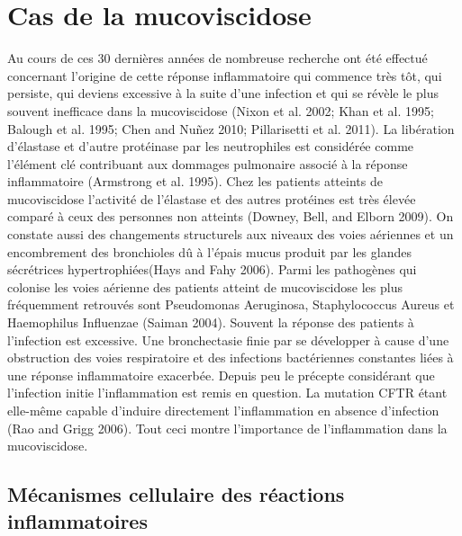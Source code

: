 		\section{Cas de la mucoviscidose}
Au cours de ces 30 dernières années de nombreuse recherche ont été effectué concernant l’origine de cette réponse inflammatoire qui commence très tôt, qui persiste, qui deviens excessive à la suite d’une infection et qui se révèle le plus souvent inefficace dans la mucoviscidose (Nixon et al. 2002; Khan et al. 1995; Balough et al. 1995; Chen and Nuñez 2010; Pillarisetti et al. 2011)\cite{nixon_early_2002}\cite{khan_early_1995}\cite{balough_relationship_1995}\cite{chen_sterile_2010}\cite{pillarisetti_infection_2011}. La libération d’élastase et d’autre protéinase par les neutrophiles est considérée comme l’élément clé contribuant aux dommages pulmonaire associé à la réponse inflammatoire (Armstrong et al. 1995)\cite{armstrong_lower_1995}. Chez les patients atteints de mucoviscidose l’activité de l’élastase et des autres protéines est très élevée comparé à ceux des personnes non atteints (Downey, Bell, and Elborn 2009)\cite{downey_neutrophils_2009}. On constate aussi des changements structurels aux niveaux des voies aériennes et un encombrement des bronchioles dû à l’épais mucus produit par les glandes sécrétrices hypertrophiées(Hays and Fahy 2006)\cite{hays_characterizing_2006}. 
Parmi les pathogènes qui colonise les voies aérienne des patients atteint de mucoviscidose les plus fréquemment retrouvés sont Pseudomonas Aeruginosa, Staphylococcus Aureus et Haemophilus Influenzae (Saiman 2004)\cite{saiman_microbiology_2004}. Souvent la réponse des patients à l’infection est excessive. Une bronchectasie finie par se développer à cause d’une obstruction des voies respiratoire et des infections bactériennes constantes liées à une réponse inflammatoire exacerbée. Depuis peu le précepte considérant que l’infection initie l’inflammation est remis en question. La mutation CFTR étant elle-même capable d’induire directement l’inflammation en absence d’infection (Rao and Grigg 2006)\cite{rao_new_2006}. Tout ceci montre l’importance de l’inflammation dans la mucoviscidose. 

			\subsection{Mécanismes cellulaire des réactions inflammatoires }
